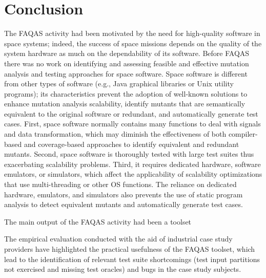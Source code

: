 
\chapter*{Conclusion}
\label{sec:conclusion}

The FAQAS activity had been motivated by the need for high-quality software in space systems; indeed, the success of space missions depends on the quality of the system hardware as much on the dependability of its software. Before FAQAS there was no work on identifying and assessing feasible and effective mutation analysis and testing approaches for space software. Space software is different from other types of software (e.g., Java graphical libraries or Unix utility programs); its characteristics prevent the adoption of well-known solutions to enhance mutation analysis scalability, identify mutants that are semantically equivalent to the original software or redundant, and automatically generate test cases. First, space software normally contains many functions to deal with signals and data transformation, which may diminish the effectiveness of both compiler-based and coverage-based approaches to identify equivalent and redundant mutants. Second, space software is thoroughly tested with large test suites thus exacerbating scalability problems. Third, it requires dedicated hardware, software emulators, or simulators, which affect the applicability of scalability optimizations that use multi-threading or other OS functions. The reliance on dedicated hardware, emulators, and simulators also prevents the use of static program analysis to detect equivalent mutants and automatically generate test cases. 

The main output of the FAQAS activity had been a toolset 

The empirical evaluation conducted with the aid of industrial case study providers have highlighted the practical usefulness of the FAQAS toolset, which lead to the identification of relevant test suite shortcomings (test input partitions not exercised and missing test oracles) and bugs in the case study subjects.